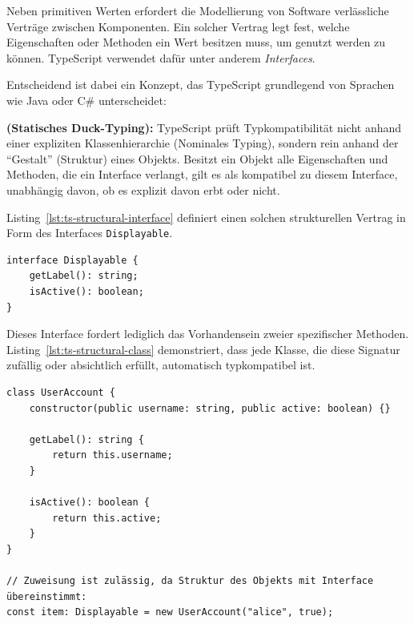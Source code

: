 Neben primitiven Werten erfordert die Modellierung von Software verlässliche Verträge zwischen Komponenten. Ein solcher Vertrag legt fest, welche Eigenschaften oder Methoden ein Wert besitzen muss, um genutzt werden zu können. TypeScript verwendet dafür unter anderem \textit{Interfaces}.

Entscheidend ist dabei ein Konzept, das TypeScript grundlegend von Sprachen wie Java oder C\# unterscheidet:

\begin{definition}
\label{def:ts-structural-typing}
\textbf{ (Statisches Duck-Typing):} TypeScript prüft Typkompatibilität nicht anhand einer expliziten Klassenhierarchie (Nominales Typing), sondern rein anhand der \enquote{Gestalt} (Struktur) eines Objekts. Besitzt ein Objekt alle Eigenschaften und Methoden, die ein Interface verlangt, gilt es als kompatibel zu diesem Interface, unabhängig davon, ob es explizit davon erbt oder nicht.
\end{definition}

Listing~\ref{lst:ts-structural-interface} definiert einen solchen strukturellen Vertrag in Form des Interfaces \texttt{Displayable}.

\begin{listing}[htbp]
    \caption{Ein Interface als Vertrag über benötigte Methoden}
    \label{lst:ts-structural-interface}
    \begin{verbatim}
interface Displayable {
    getLabel(): string;
    isActive(): boolean;
}
    \end{verbatim}
\end{listing}

Dieses Interface fordert lediglich das Vorhandensein zweier spezifischer Methoden. Listing~\ref{lst:ts-structural-class} demonstriert, dass jede Klasse, die diese Signatur zufällig oder absichtlich erfüllt, automatisch typkompatibel ist.

\begin{listing}[htbp]
    \caption{Eine Klasse erfüllt ein Interface über ihre reine Struktur}
    \label{lst:ts-structural-class}
    \begin{verbatim}
class UserAccount {
    constructor(public username: string, public active: boolean) {}
    
    getLabel(): string {
        return this.username;
    }
    
    isActive(): boolean {
        return this.active;
    }
}

// Zuweisung ist zulässig, da Struktur des Objekts mit Interface übereinstimmt:
const item: Displayable = new UserAccount("alice", true);
    \end{verbatim}
\end{listing}


